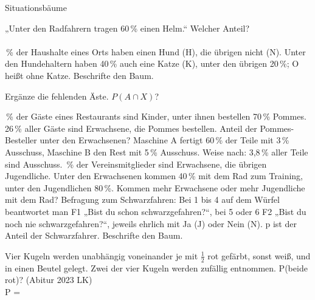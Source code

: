 \setcounter{aufgabe}{24}

\begin{aufgabe}{Situationsbäume}
\begin{teile}
\teil „Unter den Radfahrern tragen 60\,\% einen Helm.“ Welcher Anteil?\\ \\ 
\,\% der Haushalte eines Orts haben einen Hund (H), die übrigen nicht (N). Unter den Hundehaltern haben 40\,\% auch eine Katze (K), unter den übrigen 20\,\%; O heißt ohne Katze. Beschrifte den Baum.

\teil Ergänze die fehlenden Äste. $P(A \cap X)$?

\,\% der Gäste eines Restaurants sind Kinder, unter ihnen bestellen 70\,\% Pommes. 26\,\% aller Gäste sind Erwachsene, die Pommes bestellen. Anteil der Pommes-Besteller unter den Erwachsenen? \leerfeld
\teil Maschine A fertigt 60\,\% der Teile mit 3\,\% Ausschuss, Maschine B den Rest mit 5\,\% Ausschuss. Weise nach: 3,8\,\% aller Teile sind Ausschuss.
\,\% der Vereinsmitglieder sind Erwachsene, die übrigen Jugendliche. Unter den Erwachsenen kommen 40\,\% mit dem Rad zum Training, unter den Jugendlichen 80\,\%. Kommen mehr Erwachsene oder mehr Jugendliche mit dem Rad?
\teil Befragung zum Schwarzfahren: Bei 1 bis 4 auf dem Würfel beantwortet man F1 „Bist du schon schwarzgefahren?“, bei 5 oder 6 F2 „Bist du noch nie schwarzgefahren?“, jeweils ehrlich mit Ja (J) oder Nein (N). p ist der Anteil der Schwarzfahrer. Beschrifte den Baum.

\teil Vier Kugeln werden unabhängig voneinander je mit $\frac{1}{2}$ rot gefärbt, sonst weiß, und in einen Beutel gelegt. Zwei der vier Kugeln werden zufällig entnommen. P(beide rot)? \hfill (Abitur 2023 LK) \\ P = \leerfeld
\end{teile}
\end{aufgabe}

